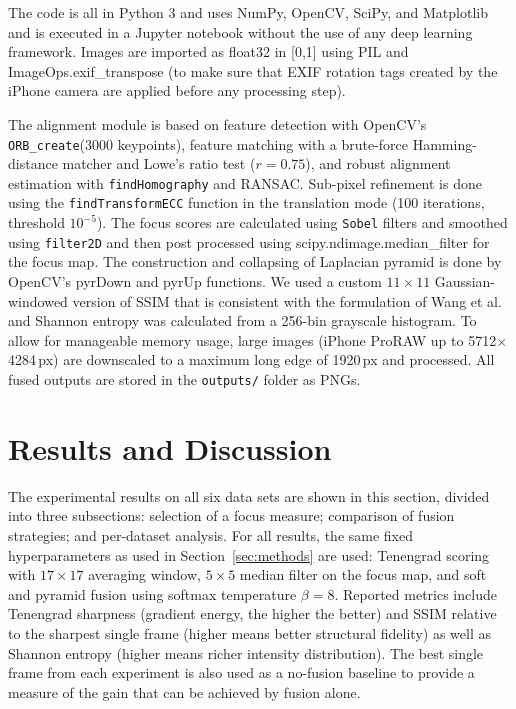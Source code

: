 \documentclass[conference]{IEEEtran}
\begin{document}
The code is all in Python 3 and uses NumPy, OpenCV, SciPy, and Matplotlib and is executed in a Jupyter notebook without the use of any deep learning framework. Images are imported as float32 in [0,1] using PIL and ImageOps.exif\_transpose (to make sure that EXIF rotation tags created by the iPhone camera are applied before any processing step).

The alignment module is based on feature detection with OpenCV's \texttt{ORB\_create}(3000 keypoints), feature matching with a brute-force Hamming-distance matcher and Lowe's ratio test ($r=0.75$), and robust alignment estimation with \texttt{findHomography} and RANSAC. Sub-pixel refinement is done using the \texttt{findTransformECC} function in the translation mode (100 iterations, threshold $10^{-5}$). The focus scores are calculated using \texttt{Sobel} filters and smoothed using \texttt{filter2D} and then post processed using scipy.ndimage.median\_filter for the focus map. The construction and collapsing of Laplacian pyramid is done by OpenCV's pyrDown and pyrUp functions. We used a custom $11\times11$ Gaussian-windowed version of SSIM that is consistent with the formulation of Wang et al.~\cite{wang2004ssim} and Shannon entropy was calculated from a 256-bin grayscale histogram. To allow for manageable memory usage, large images (iPhone ProRAW up to 5712$\times$4284\,px) are downscaled to a maximum long edge of 1920\,px and processed. All fused outputs are stored in the \texttt{outputs/} folder as PNGs.%

\section{Results and Discussion}
The experimental results on all six data sets are shown in this section, divided into three subsections: selection of a focus measure; comparison of fusion strategies; and per-dataset analysis. For all results, the same fixed hyperparameters as used in Section~\ref{sec:methods} are used: Tenengrad scoring with $17\times17$ averaging window, $5\times5$ median filter on the focus map, and soft and pyramid fusion using softmax temperature $\beta=8$. Reported metrics include Tenengrad sharpness (gradient energy, the higher the better) and SSIM relative to the sharpest single frame (higher means better structural fidelity) as well as Shannon entropy (higher means richer intensity distribution). The best single frame from each experiment is also used as a no-fusion baseline to provide a measure of the gain that can be achieved by fusion alone.
\end{document}
